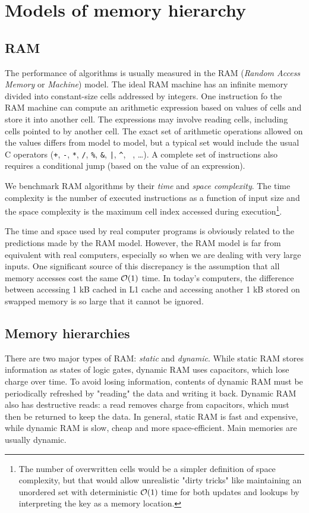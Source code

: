 \chapter{Models of memory hierarchy}
\section{RAM}

The performance of algorithms is usually measured in the RAM
(\textit{Random Access Memory} or \textit{Machine}) model.
The ideal RAM machine has an infinite memory divided into constant-size
cells addressed by integers.
One instruction fo the RAM machine can compute an arithmetic expression
based on values of cells and store it into another cell. The expressions
may involve reading cells, including cells pointed to by another cell.
The exact set of arithmetic operations allowed on the values differs
from model to model, but a typical set would include the usual C operators
(\texttt{+}, \texttt{-}, \texttt{*}, \texttt{/}, \texttt{\%}, \texttt{\&},
 \texttt{|}, \texttt{\^}, \texttt{~}, \dots).
A complete set of instructions also requires a conditional jump (based on
the value of an expression).

We benchmark RAM algorithms by their \textit{time} and \textit{space complexity}.
The time complexity is the number of executed instructions as a function of
input size and the space complexity is the maximum cell index accessed during
execution\footnote{
	The number of overwritten cells would be a simpler definition
	of space complexity, but that would allow unrealistic "dirty tricks"
	like maintaining an unordered set with deterministic $\mathcal{O}(1)$ time
	for both updates and lookups by interpreting the key as a memory
	location.
}.

The time and space used by real computer programs is obviously related
to the predictions made by the RAM model. However, the RAM model is far
from equivalent with real computers, especially so when we are dealing with
very large inputs. One significant source of this discrepancy is the assumption
that all memory accesses cost the same $\mathcal{O}(1)$ time. In today's computers,
the difference between accessing 1 kB cached in L1 cache and accessing
another 1 kB stored on swapped memory is so large that it cannot be ignored.

\section{Memory hierarchies}
There are two major types of RAM: \textit{static} and \textit{dynamic}.
While static RAM stores information as states of logic gates, dynamic RAM
uses capacitors, which lose charge over time. To avoid losing information,
contents of dynamic RAM must be periodically refreshed by "reading" the data
and writing it back. Dynamic RAM also has destructive reads: a read removes
charge from capacitors, which must then be returned to keep the data.
In general, static RAM is fast and expensive, while dynamic RAM is slow,
cheap and more space-efficient. Main memories are usually dynamic.

